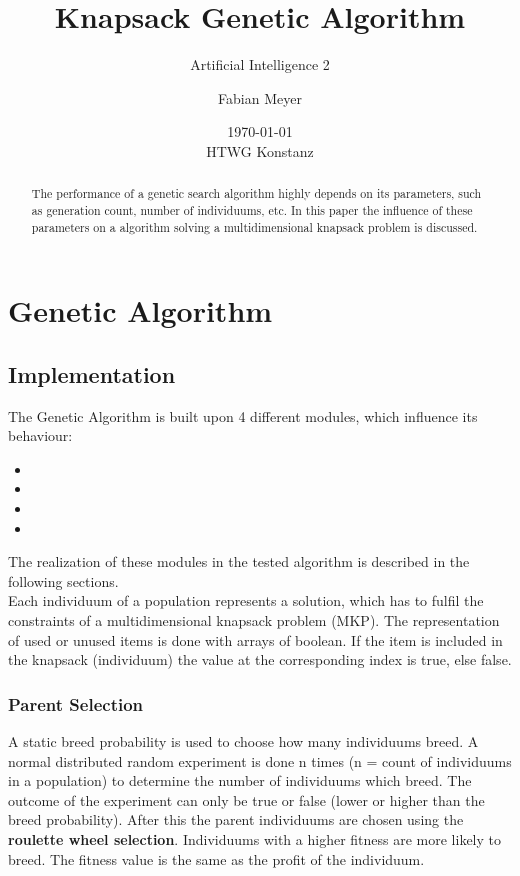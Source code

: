 \documentclass[fontsize=12pt,toc=bibliography, notitlepage]{scrreprt}
\title{Knapsack Genetic Algorithm}
\subtitle{Artificial Intelligence 2}
\author{Fabian Meyer}
\date{\today \\ HTWG Konstanz}
\begin{document}
\maketitle
\begin{abstract}
The performance of a genetic search algorithm highly depends on its parameters, such as generation count, number of individuums, etc. In this paper the influence of these parameters on a algorithm solving a multidimensional knapsack problem is discussed.
\end{abstract}
\tableofcontents

\chapter{Genetic Algorithm}
\label{chap:genetic-algorithm}

\section{Implementation}
\label{sec:implementation}

The Genetic Algorithm is built upon 4 different modules, which influence its behaviour:
\begin{itemize}
	\item {}
	\item {}
	\item {}
	\item {}
\end{itemize}
The realization of these modules in the tested algorithm is described in the following sections. \\
Each individuum of a population represents a solution, which has to fulfil the constraints of a multidimensional knapsack problem (MKP). The representation of used or unused items is done with arrays of boolean. If the item is included in the knapsack (individuum) the value at the corresponding index is true, else false.

\subsection{Parent Selection}
\label{subsec:parent-selection}
A static breed probability is used to choose how many individuums breed. A normal distributed random experiment is done n times (n = count of individuums in a population) to determine the number of individuums which breed. The outcome of the experiment can only be true or false (lower or higher than the breed probability).
After this the parent individuums are chosen using the \textbf{roulette wheel selection}. Individuums with a higher fitness are more likely to breed. The fitness value is the same as the profit of the individuum. \\
\end{document}
